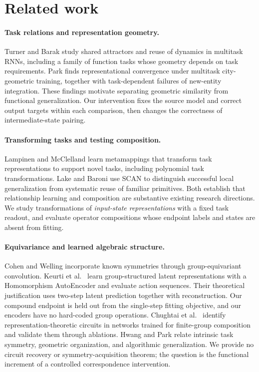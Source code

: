 \section{Related work}
\paragraph{Task relations and representation geometry.}
Turner and Barak \cite{turner2023} study shared attractors and reuse of dynamics in multitask RNNs, including a family of function tasks whose geometry depends on task requirements. Park \cite{park2026} finds representational convergence under multitask city-geometric training, together with task-dependent failures of new-entity integration. These findings motivate separating geometric similarity from functional generalization. Our intervention fixes the source model and correct output targets within each comparison, then changes the correctness of intermediate-state pairing.

\paragraph{Transforming tasks and testing composition.}
Lampinen and McClelland \cite{lampinen2020} learn metamappings that transform task representations to support novel tasks, including polynomial task transformations. Lake and Baroni \cite{lake2018} use SCAN to distinguish successful local generalization from systematic reuse of familiar primitives. Both establish that relationship learning and composition are substantive existing research directions. We study transformations of \emph{input-state representations} with a fixed task readout, and evaluate operator compositions whose endpoint labels and states are absent from fitting.

\paragraph{Equivariance and learned algebraic structure.}
Cohen and Welling \cite{cohen2016} incorporate known symmetries through group-equivariant convolution. Keurti et al.\ \cite{keurti2023} learn group-structured latent representations with a Homomorphism AutoEncoder and evaluate action sequences. Their theoretical justification uses two-step latent prediction together with reconstruction. Our compound endpoint is held out from the single-step fitting objective, and our encoders have no hard-coded group operations. Chughtai et al.\ \cite{chughtai2023} identify representation-theoretic circuits in networks trained for finite-group composition and validate them through ablations. Hwang and Park \cite{hwang2026} relate intrinsic task symmetry, geometric organization, and algorithmic generalization. We provide no circuit recovery or symmetry-acquisition theorem; the question is the functional increment of a controlled correspondence intervention.

